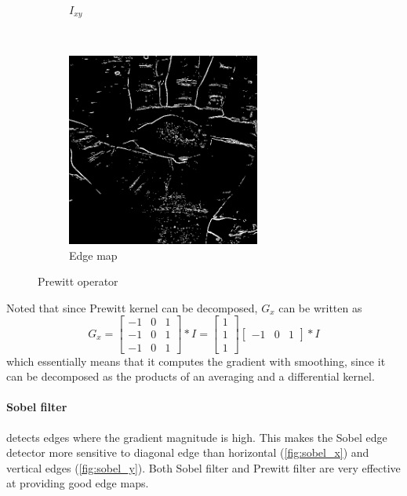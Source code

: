 \documentclass[12pt]{article}
\begin{document}
\begin{figure}[H]
\begin{subfigure}[t]{0.5\textwidth}
        \caption{$I_{xy}$}
    \end{subfigure}%
    ~
    \begin{subfigure}[t]{0.5\textwidth}
        \centering
        \includegraphics[height=2.5in]{images/prewitt_edge}
        \caption{Edge map}
    \end{subfigure}
    \caption{Prewitt operator}
\end{figure}

Noted that since Prewitt kernel can be decomposed, $G_x$ can be written as 
\begin{equation}
	G_x = \begin{bmatrix}
		-1 & 0 & 1 \\ -1 & 0 & 1 \\ -1 & 0 & 1 
	\end{bmatrix} \ast I
	= \begin{bmatrix}
		1 \\ 1 \\ 1 
	\end{bmatrix} \begin{bmatrix}
 		-1 & 0 & 1	
	\end{bmatrix}
	\ast I
\end{equation}
which essentially means that it computes the gradient with smoothing, since it can be decomposed as the products of an averaging and a differential kernel.

\paragraph*{Sobel filter} detects edges where the gradient magnitude is high. 
This makes the Sobel edge detector more sensitive to diagonal edge than horizontal (\autoref{fig:sobel_x}) and vertical edges (\autoref{fig:sobel_y}). 
Both Sobel filter and Prewitt filter are very effective at providing good edge maps.
\end{document}
